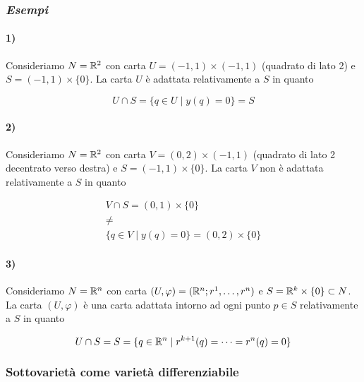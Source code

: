 \subsubsection{\textit{Esempi}}

\paragraph{1)}

Consideriamo $ N = \mathbb{R}^{2} $ con carta $ U = (-1,1) \times (-1,1) $ (quadrato di lato 2) e $ S = (-1,1) \times \{0\} $. La carta $ U $ è adattata relativamente a $ S $ in quanto

\begin{equation}
	U \cap S = \{ q \in U \mid y(q) = 0 \} = S
\end{equation}

\paragraph{2)}

Consideriamo $ N = \mathbb{R}^{2} $ con carta $ V = (0,2) \times (-1,1) $ (quadrato di lato 2 decentrato verso destra) e $ S = (-1,1) \times \{0\} $. La carta $ V $ non è adattata relativamente a $ S $ in quanto

\begin{gather}
	V \cap S = (0,1) \times \{0\}\nonumber \\
	\neq \\
	\{ q \in V \mid y(q) = 0 \} = (0,2) \times \{0\}\nonumber
\end{gather}

\paragraph{3)}

Consideriamo $ N = \mathbb{R}^{n} $ con carta $ (U,\varphi) = (\mathbb{R}^{n}; r^{1},\dots,r^{n}) $ e $ S = \mathbb{R}^{k} \times \{0\} \subset N $. La carta $ (U,\varphi) $ è una carta adattata intorno ad ogni punto $ p \in S $ relativamente a $ S $ in quanto

\begin{equation}
	U \cap S = S = \{ q \in \mathbb{R}^{n} \mid r^{k+1}(q) = \dots = r^{n}(q) = 0 \}
\end{equation}

\subsubsection{Sottovarietà come varietà differenziabile}

